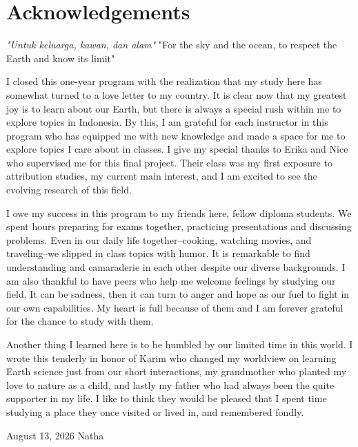\chapter*{Acknowledgements}

\textit{"Untuk keluarga, kawan, dan alam"} \newline
"For the sky and the ocean, to respect the Earth and know its limit" \newline

I closed this one-year program with the realization that my study here has somewhat turned to a love letter to my country. It is clear now that my greatest joy is to learn about our Earth, but there is always a special rush within me to explore topics in Indonesia. By this, I am grateful for each instructor in this program who has equipped me with new knowledge and made a space for me to explore topics I care about in classes. I give my special thanks to Erika and Nice who supervised me for this final project. Their class was my first exposure to attribution studies, my current main interest, and I am excited to see the evolving research of this field.

I owe my success in this program to my friends here, fellow diploma students. We spent hours preparing for exams together, practicing presentations and discussing problems. Even in our daily life together--cooking, watching movies, and traveling--we slipped in class topics with humor. It is remarkable to find understanding and camaraderie in each other despite our diverse backgrounds. I am also thankful to have peers who help me welcome feelings by studying our field. It can be sadness, then it can turn to anger and hope as our fuel to fight in our own capabilities. My heart is full because of them and I am forever grateful for the chance to study with them.

Another thing I learned here is to be humbled by our limited time in this world. I wrote this tenderly in honor of Karim who changed my worldview on learning Earth science just from our short interactions, my grandmother who planted my love to nature as a child, and lastly my father who had always been the quite supporter in my life. I like to think they would be pleased that I spent time studying a place they once visited or lived in, and remembered fondly. \newline

August 13, 2026 \newline
Natha